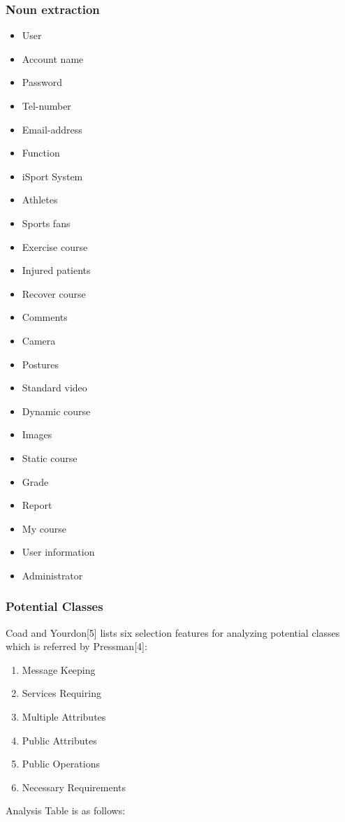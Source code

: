 \documentclass[16pt]{scrreprt}
\begin{document}
\subsubsection{Noun extraction}
\begin{itemize}
	\item User
	\item Account name
	\item Password
	\item Tel-number
	\item Email-address
	\item Function
	\item iSport System
	\item Athletes
	\item Sports fans
	\item Exercise course
	\item Injured patients
	\item Recover course
	\item Comments
	\item Camera
	\item Postures
	\item Standard video
	\item Dynamic course
	\item Images
	\item Static course
	\item Grade
	\item Report
	\item My course
	\item User information
	\item Administrator
\end{itemize}

\subsubsection{Potential Classes}
 Coad and Yourdon[5] lists six selection features for analyzing potential classes which is  referred by Pressman[4]:
 \begin{enumerate}
 	\item Message Keeping
 	\item Services Requiring
 	\item Multiple Attributes
 	\item Public Attributes
 	\item Public Operations
 	\item Necessary Requirements
 \end{enumerate}
 Analysis Table is as follows:
 
\end{document}
